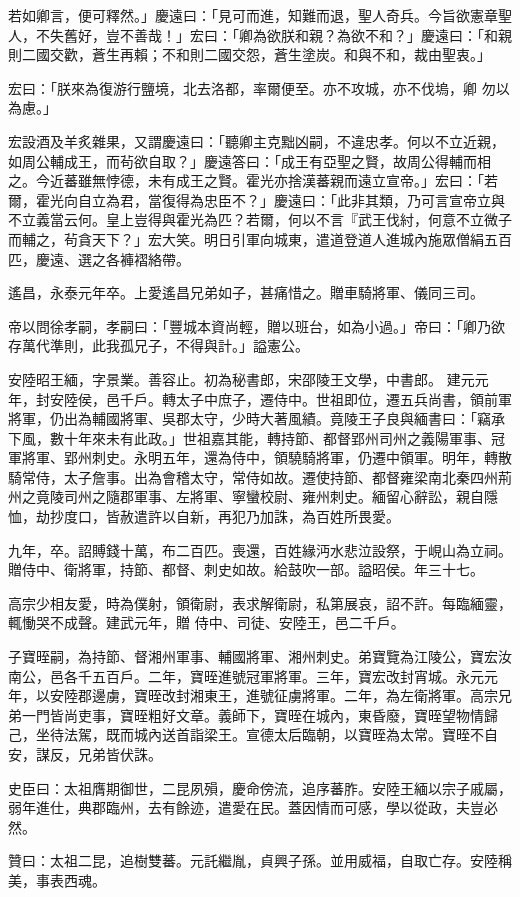 \begin{pinyinscope}
 若如卿言，便可釋然。」慶遠曰：「見可而進，知難而退，聖人奇兵。今旨欲憲章聖人，不失舊好，豈不善哉！」宏曰：「卿為欲朕和親？為欲不和？」慶遠曰：「和親則二國交歡，蒼生再賴；不和則二國交怨，蒼生塗炭。和與不和，裁由聖衷。」



 宏曰：「朕來為復游行鹽境，北去洛都，率爾便至。亦不攻城，亦不伐塢，卿
 勿以為慮。」



 宏設酒及羊炙雜果，又謂慶遠曰：「聽卿主克黜凶嗣，不違忠孝。何以不立近親，如周公輔成王，而茍欲自取？」慶遠答曰：「成王有亞聖之賢，故周公得輔而相之。今近蕃雖無悖德，未有成王之賢。霍光亦捨漢蕃親而遠立宣帝。」宏曰：「若爾，霍光向自立為君，當復得為忠臣不？」慶遠曰：「此非其類，乃可言宣帝立與不立義當云何。皇上豈得與霍光為匹？若爾，何以不言『武王伐紂，何意不立微子而輔之，茍貪天下？」宏大笑。明日引軍向城東，遣道登道人進城內施眾僧絹五百匹，慶遠、選之各褲褶絡帶。



 遙昌，永泰元年卒。上愛遙昌兄弟如子，甚痛惜之。贈車騎將軍、儀同三司。



 帝以問徐孝嗣，孝嗣曰：「豐城本資尚輕，贈以班台，如為小過。」帝曰：「卿乃欲存萬代準則，此我孤兄子，不得與計。」謚憲公。



 安陸昭王緬，字景業。善容止。初為秘書郎，宋邵陵王文學，中書郎。
 建元元年，封安陸侯，邑千戶。轉太子中庶子，遷侍中。世祖即位，遷五兵尚書，領前軍將軍，仍出為輔國將軍、吳郡太守，少時大著風績。竟陵王子良與緬書曰：「竊承下風，數十年來未有此政。」世祖嘉其能，轉持節、都督郢州司州之義陽軍事、冠軍將軍、郢州刺史。永明五年，還為侍中，領驍騎將軍，仍遷中領軍。明年，轉散騎常侍，太子詹事。出為會稽太守，常侍如故。遷使持節、都督雍梁南北秦四州荊州之竟陵司州之隨郡軍事、左將軍、寧蠻校尉、雍州刺史。緬留心辭訟，親自隱恤，劫抄度口，皆赦遣許以自新，再犯乃加誅，為百姓所畏愛。



 九年，卒。詔賻錢十萬，布二百匹。喪還，百姓緣沔水悲泣設祭，于峴山為立祠。贈侍中、衛將軍，持節、都督、刺史如故。給鼓吹一部。謚昭侯。年三十七。



 高宗少相友愛，時為僕射，領衛尉，表求解衛尉，私第展哀，詔不許。每臨緬靈，輒慟哭不成聲。建武元年，贈
 侍中、司徒、安陸王，邑二千戶。



 子寶晊嗣，為持節、督湘州軍事、輔國將軍、湘州刺史。弟寶覽為江陵公，寶宏汝南公，邑各千五百戶。二年，寶晊進號冠軍將軍。三年，寶宏改封宵城。永元元年，以安陸郡邊虜，寶晊改封湘東王，進號征虜將軍。二年，為左衛將軍。高宗兄弟一門皆尚吏事，寶晊粗好文章。義師下，寶晊在城內，東昏廢，寶晊望物情歸己，坐待法駕，既而城內送首詣梁王。宣德太后臨朝，以寶晊為太常。寶晊不自安，謀反，兄弟皆伏誅。



 史臣曰：太祖膺期御世，二昆夙殞，慶命傍流，追序蕃胙。安陸王緬以宗子戚屬，弱年進仕，典郡臨州，去有餘迹，遣愛在民。蓋因情而可感，學以從政，夫豈必然。



 贊曰：太祖二昆，追樹雙蕃。元託繼胤，貞興子孫。並用威福，自取亡存。安陸稱美，事表西魂。



\end{pinyinscope}